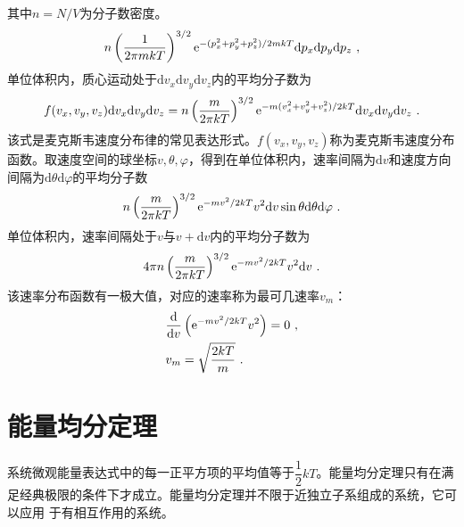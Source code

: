 \documentclass[12pt,a4paper]{article}
\newcommand{\dif}{\mathrm{d}}
\begin{document}
其中$n=N/V$为分子数密度。
\begin{equation}
n \left(\dfrac{1}{2\pi mkT} \right)^{3/2} {\rm e}^{-(p^2_x +p^2_y +p^2_z)/2mkT} \dif p_x \dif p_y \dif p_z ~,
\end{equation}
单位体积内，质心运动处于$\dif v_x \dif v_y \dif v_z $内的平均分子数为
\begin{equation}
f(v_x, v_y, v_z) \dif v_x \dif v_y \dif v_z = n \left(\dfrac{m}{2\pi kT} \right)^{3/2} {\rm e}^{-m(v^2_x +v^2_y +v^2_z)/2kT} \dif v_x \dif v_y \dif v_z ~.
\end{equation}
该式是麦克斯韦速度分布律的常见表达形式。$f(v_x, v_y, v_z)$称为麦克斯韦速度分布函数。取速度空间的球坐标$v, \theta, \varphi$，得到在单位体积内，速率间隔为$\dif v$和速度方向间隔为$\dif \theta \dif \varphi$的平均分子数
\begin{equation}
n \left(\dfrac{m}{2\pi kT} \right)^{3/2} {\rm e}^{-mv^2/2kT} v^2 \dif v \sin \theta \dif \theta \dif \varphi ~.
\end{equation}
单位体积内，速率间隔处于$v$与$v +\dif v$内的平均分子数为
\begin{equation}
4\pi n \left(\dfrac{m}{2\pi kT} \right)^{3/2} {\rm e}^{-mv^2/2kT} v^2 \dif v ~.
\end{equation}
该速率分布函数有一极大值，对应的速率称为最可几速率$v_m$：
\begin{align}
& \dfrac{\dif }{\dif v} \left( {\rm e}^{-mv^2/2kT} v^2 \right) = 0 ~, \\
& v_m = \sqrt{\dfrac{2kT}{m} } ~.
\end{align}






















\section{能量均分定理}
系统微观能量表达式中的每一正平方项的平均值等于$\dfrac{1}{2} k T$。能量均分定理只有在满足经典极限的条件下才成立。能量均分定理并不限于近独立子系组成的系统，它可以应用 于有相互作用的系统。
\end{document}
